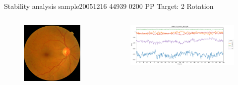 \documentclass{beamer}
\begin{document}
\begin{frame}{Stability analysis sample}{20051216 44939 0200 PP Target: 2 Rotation}
\begin{columns}
	\begin{column}{0.3\textwidth}
		\begin{figure}[p]
			\centering
			\includegraphics[width=\textwidth]{chapter_stability/20051216_44939_0200_PP/20051216_44939_0200_PP.jpeg}
		\end{figure}	
	\end{column}
	\begin{column}{0.45\textwidth}  %
		\begin{figure}[p]
			\centering
			\includegraphics[width=\textwidth]{chapter_stability/20051216_44939_0200_PP/r/scores.png}
		\end{figure}
		\centering
		\href{run:videos_stability/Messidor_20051216_44939_0200_PP_Target_2_Checking_Rotation_Sensitivity.mp4}{\color{blue}{Rotation Visualization}} 
	\end{column}
\end{columns}
\end{frame}
\end{document}

